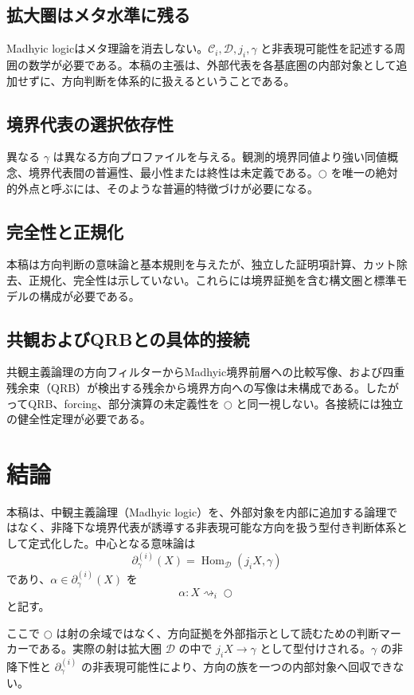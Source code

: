 \documentclass[a4paper,11pt]{ltjsarticle}
\theoremstyle{definition}
\theoremstyle{plain}
\newcommand{\Hom}{\operatorname{Hom}}
\newcommand{\dfix}{\bigcirc}
\begin{document}
\subsection{拡大圏はメタ水準に残る}

Madhyic logicはメタ理論を消去しない。$\mathcal C_i,\mathcal D,j_i,\gamma$ と非表現可能性を記述する周囲の数学が必要である。本稿の主張は、外部代表を各基底圏の内部対象として追加せずに、方向判断を体系的に扱えるということである。

\subsection{境界代表の選択依存性}

異なる $\gamma$ は異なる方向プロファイルを与える。観測的境界同値より強い同値概念、境界代表間の普遍性、最小性または終性は未定義である。$\dfix$ を唯一の絶対的外点と呼ぶには、そのような普遍的特徴づけが必要になる。

\subsection{完全性と正規化}

本稿は方向判断の意味論と基本規則を与えたが、独立した証明項計算、カット除去、正規化、完全性は示していない。これらには境界証拠を含む構文圏と標準モデルの構成が必要である。

\subsection{共観およびQRBとの具体的接続}

共観主義論理の方向フィルターからMadhyic境界前層への比較写像、および四重残余束（QRB）が検出する残余から境界方向への写像は未構成である。したがってQRB、forcing、部分演算の未定義性を $\dfix$ と同一視しない。各接続には独立の健全性定理が必要である。

\section{結論}

本稿は、中観主義論理（Madhyic logic）を、外部対象を内部に追加する論理ではなく、非降下な境界代表が誘導する非表現可能な方向を扱う型付き判断体系として定式化した。中心となる意味論は
\[
 \boxed{
 \partial_\gamma^{(i)}(X)
 =\Hom_{\mathcal D}(j_iX,\gamma)
 }
\]
であり、$\alpha\in\partial_\gamma^{(i)}(X)$ を
\[
 \boxed{
 \alpha:X\rightsquigarrow_i\dfix
 }
\]
と記す。

ここで $\dfix$ は射の余域ではなく、方向証拠を外部指示として読むための判断マーカーである。実際の射は拡大圏 $\mathcal D$ の中で $j_iX\to\gamma$ として型付けされる。$\gamma$ の非降下性と $\partial_\gamma^{(i)}$ の非表現可能性により、方向の族を一つの内部対象へ回収できない。
\end{document}
